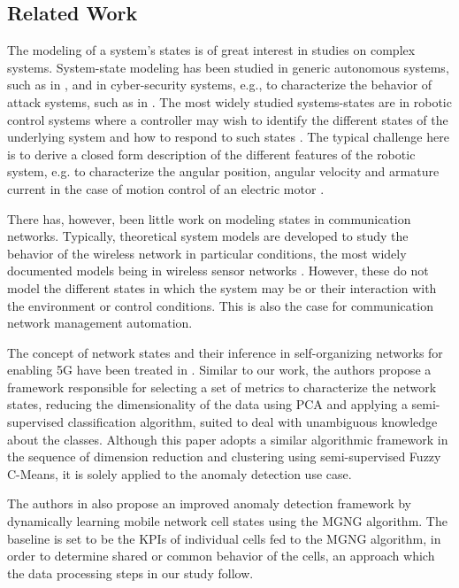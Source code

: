 		 \subsection{Related Work}
		 
 			The modeling of a system's states is of great interest in studies on complex systems.
 			System-state modeling has been studied in generic autonomous systems, such as in \cite{model_hazard_phd}, and in cyber-security systems, e.g., to characterize the behavior of attack systems, such as in \cite{model_relab_optim, model_defense}.
 			The most widely studied systems-states are in robotic control systems where a controller may wish to identify the different states of the underlying system and how to respond to such states \cite{model_sonar_robot, model_wheeled_robot}.
 			The typical challenge here is to derive a closed form description of the different features of the robotic system, e.g. to characterize the angular position, angular velocity and armature current in the case of motion control of an electric motor \cite{model_fpga_pid}.
		 	
		 	There has, however, been little work on modeling states in communication networks.
		 	Typically, theoretical system models are developed to study the behavior of the wireless network in particular conditions, the most widely documented models being in wireless sensor networks \cite{model_routing, model_lmac}.
		 	However, these do not model the different states in which the system may be or their interaction with the environment or control conditions.
		 	This is also the case for communication network management automation.
		 	
		 	The concept of network states and their inference in self-organizing networks for enabling \ac{5G} have been treated in \cite{qi_anomalydet}.
		 	Similar to our work, the authors propose a framework responsible for selecting a set of metrics to characterize the network states, reducing the dimensionality of the data using \ac{PCA} and applying a semi-supervised classification algorithm, suited to deal with unambiguous knowledge about the classes.
		 	Although this paper adopts a similar algorithmic framework in the sequence of dimension reduction and clustering using semi-supervised Fuzzy C-Means, it is solely applied to the anomaly detection use case.
		 	
		 	The authors in \cite{borislava_improved} also propose an improved anomaly detection framework by dynamically learning mobile network cell states using the \ac{MGNG} algorithm.
		 	The baseline is set to be the \acp{KPI} of individual cells fed to the \ac{MGNG} algorithm, in order to determine shared or common behavior of the cells, an approach which the data processing steps in our study follow.

